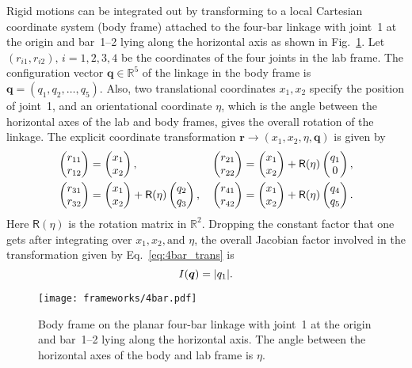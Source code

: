 Rigid motions can be integrated out by transforming to a local Cartesian coordinate system (body frame) attached to the four-bar linkage with joint~1 at the origin and bar~1--2 lying along the horizontal axis as shown in Fig.~\ref{fig:4bar}.
Let $(r_{i1}, r_{i2}),\, i = 1, 2, 3, 4$ be the coordinates of the four joints in the lab frame.
The configuration vector $\bm{q} \in \mathbb{R}^{5}$ of the linkage in the body frame is $\bm{q} = (q_{1}, q_{2}, \ldots, q_{5})$.
Also, two translational coordinates $x_{1}, x_{2}$ specify the position of joint~1, and an orientational coordinate $\eta$, which is the angle between the horizontal axes of the lab and body frames, gives the overall rotation of the linkage.
The explicit coordinate transformation $\bm{r} \to (x_{1}, x_{2}, \eta, \bm{q})$ is given by
%
\begin{equation}
  \begin{aligned}
    \begin{pmatrix}r_{11} \\ r_{12}\end{pmatrix} &= \begin{pmatrix}x_{1} \\ x_{2}\end{pmatrix}, {}&
    \begin{pmatrix}r_{21} \\ r_{22}\end{pmatrix} &= \begin{pmatrix}x_{1} \\ x_{2}\end{pmatrix} + \mathsf{R}(\eta)\begin{pmatrix}q_1 \\ 0\end{pmatrix},\\
    \begin{pmatrix}r_{31} \\ r_{32}\end{pmatrix} &= \begin{pmatrix}x_{1} \\ x_{2}\end{pmatrix} + \mathsf{R}(\eta)\begin{pmatrix}q_2 \\ q_3\end{pmatrix}, {}&
    \begin{pmatrix}r_{41} \\ r_{42}\end{pmatrix} &= \begin{pmatrix}x_{1} \\ x_{2}\end{pmatrix} + \mathsf{R}(\eta)\begin{pmatrix}q_4 \\ q_5\end{pmatrix}.
  \end{aligned}
  \label{eq:4bar_trans}
\end{equation}
%
Here $\mathsf{R}(\eta)$ is the rotation matrix in $\mathbb{R}^2$.
Dropping the constant factor that one gets after integrating over $x_1, x_2, \text{and } \eta$, the overall Jacobian factor involved in the transformation given by Eq.~\eqref{eq:4bar_trans} is
%
\begin{equation}
  I(\bm{q}) = \lvert q_1\rvert.
  \label{eq:4bar_jacobian}
\end{equation}
%
\begin{figure}
  \begin{center}
    \texttt{[image: frameworks/4bar.pdf]}
  \end{center}
  \caption{Body frame on the planar four-bar linkage with joint~1 at the origin and bar~1--2 lying along the horizontal axis.
    The angle between the horizontal axes of the body and lab frame is $\eta$.}
  \label{fig:4bar}
\end{figure}

